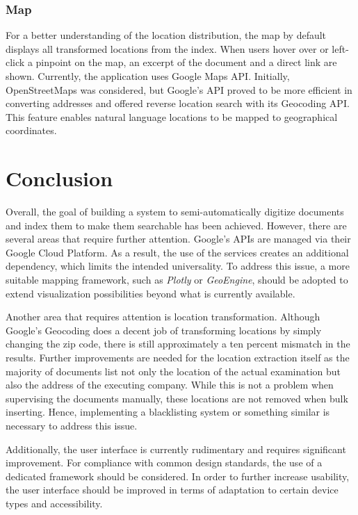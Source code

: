 \documentclass[12pt]{article}
\begin{document}
\subsubsection{Map}
\label{sssec:map}

For a better understanding of the location distribution, the map by default displays all transformed locations from the index. When users hover over or left-click a pinpoint on the map, an excerpt of the document and a direct link are shown. Currently, the application uses Google Maps API. Initially, OpenStreetMaps was considered, but Google's API proved to be more efficient in converting addresses and offered reverse location search with its Geocoding API. This feature enables natural language locations to be mapped to geographical coordinates.

\section{Conclusion}
\label{sec:conclusion}

Overall, the goal of building a system to semi-automatically digitize documents and index them to make them searchable has been achieved. However, there are several areas that require further attention. Google's APIs are managed via their Google Cloud Platform. As a result, the use of the services creates an additional dependency, which limits the intended universality. To address this issue, a more suitable mapping framework, such as \textit{Plotly} or \textit{GeoEngine}, should be adopted to extend visualization possibilities beyond what is currently available. 

Another area that requires attention is location transformation. Although Google's Geocoding does a decent job of transforming locations by simply changing the zip code, there is still approximately a ten percent mismatch in the results. Further improvements are needed for the location extraction itself as the majority of documents list not only the location of the actual examination but also the address of the executing company. While this is not a problem when supervising the documents manually, these locations are not removed when bulk inserting. Hence, implementing a blacklisting system or something similar is necessary to address this issue.

Additionally, the user interface is currently rudimentary and requires significant improvement. For compliance with common design standards, the use of a dedicated framework should be considered. In order to further increase usability, the user interface should be improved in terms of adaptation to certain device types and accessibility.


% 
% 
\end{document}
